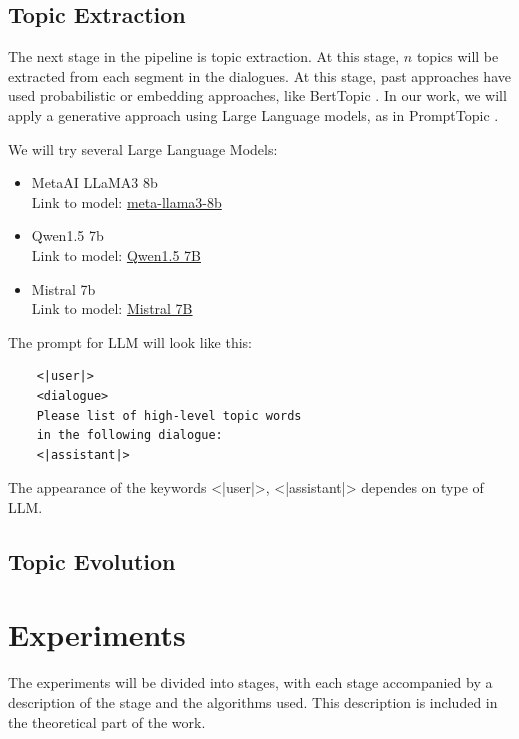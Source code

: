 \documentclass[PMI,VKR]{HSEUniversity}
\begin{document}
\section{Topic Extraction}

The next stage in the pipeline is topic extraction. At this stage, $n$ topics will be extracted from each segment in the dialogues. 
At this stage, past approaches have used probabilistic or embedding approaches, like BertTopic \cite{berttopic:2022}. 
In our work, we will apply a generative approach using Large Language models, as in PromptTopic \cite{prompttopic:2023}.

We will try several Large Language Models:
\begin{itemize}
    \item MetaAI LLaMA3 8b \\
    Link to model: \href{https://huggingface.co/meta-llama/Meta-Llama-3-8B-Instruct}{meta-llama3-8b}
    \item Qwen1.5 7b \\
    Link to model: \href{https://huggingface.co/Qwen/Qwen1.5-7B-Chat}{Qwen1.5 7B}
    \item Mistral 7b \\
    Link to model: \href{https://huggingface.co/mistralai/Mistral-7B-Instruct-v0.1}{Mistral 7B}
\end{itemize}  

The prompt for LLM will look like this:

\begin{lstlisting}
    <|user|> 
    <dialogue> 
    Please list of high-level topic words 
    in the following dialogue:
    <|assistant|>
\end{lstlisting}

The appearance of the keywords <|user|>, <|assistant|> dependes on type of LLM.



\section{Topic Evolution}




\chapter{Experiments}

The experiments will be divided into stages, with each stage accompanied by a description of the stage and the algorithms used. 
This description is included in the theoretical part of the work.
\end{document}
